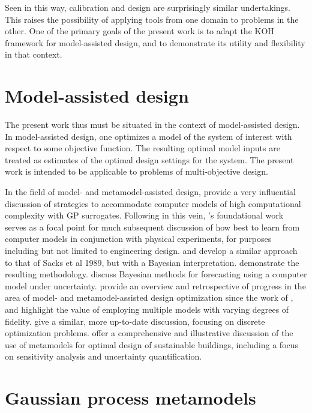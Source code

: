 \documentclass[12pt]{article}
\begin{document}
Seen in this way, calibration and design are surprisingly similar undertakings. 
This raises the possibility of applying tools from one domain to problems in the other.
One of the primary goals of the present work is to adapt the KOH framework for model-assisted design, and to demonstrate its utility and flexibility in that context.


\section{Model-assisted design}

The present work thus must be situated in the context of model-assisted design.
In model-assisted design, one optimizes a model of the system of interest with respect to some objective function.
The resulting optimal model inputs are treated as estimates of the optimal design settings for the system.
The present work is intended to be applicable to problems of multi-objective design.

In the field of model- and metamodel-assisted design, \citet{Sacks1989} provide a very influential discussion of strategies to accommodate computer models of high computational complexity with GP surrogates.
Following in this vein, \citeauthor{Santner2003a}'s \citeyearpar{Santner2003a} foundational work serves as a focal point for much subsequent discussion of how best to learn from computer models in conjunction with physical experiments, for purposes including but not limited to engineering design.
\citet{Currin1988} and \citet{Currin1991} develop a similar approach to that of Sacks et al 1989, but with a Bayesian interpretation.
\citet{Mitchell1992} demonstrate the resulting methodology.
\citet{Craig2001} discuss Bayesian methods for forecasting using a computer model under uncertainty.
\citet{Simpson2008} provide an overview and retrospective of progress in the area of model- and metamodel-assisted design optimization since the work of \citet{Sacks1989}, and highlight the value of employing multiple models with varying degrees of fidelity.
\citet{Bartz2017} give a similar, more up-to-date discussion, focusing on discrete optimization problems.
\cite{Westermann2019} offer a comprehensive and illustrative discussion of the use of metamodels for optimal design of sustainable buildings, including a focus on sensitivity analysis and uncertainty quantification.

\section{Gaussian process metamodels}
\end{document}
